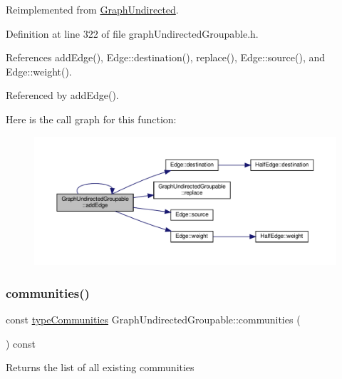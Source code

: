 Reimplemented from \hyperlink{classGraphUndirected_a366c8b7dbf1cbfe408d5399ad64494dc}{Graph\+Undirected}.



Definition at line 322 of file graph\+Undirected\+Groupable.\+h.



References add\+Edge(), Edge\+::destination(), replace(), Edge\+::source(), and Edge\+::weight().



Referenced by add\+Edge().

Here is the call graph for this function\+:\nopagebreak
\begin{figure}[H]
\begin{center}
\leavevmode
\includegraphics[width=350pt]{classGraphUndirectedGroupable_a2efe963916349ac6615721ab85a93ceb_cgraph}
\end{center}
\end{figure}
\mbox{\label{classGraphUndirectedGroupable_a57f8ea4cff0d83b80cca2dc8e8e19ff6}} 
\subsubsection{\texorpdfstring{communities()}{communities()}}
{\footnotesize\ttfamily const \hyperlink{graphUndirectedGroupable_8h_ab79c7252155ca17cb49aa0b1fea30116}{type\+Communities} Graph\+Undirected\+Groupable\+::communities (\begin{DoxyParamCaption}{ }\end{DoxyParamCaption}) const\hspace{0.3cm}{\ttfamily [inline]}}

\begin{DoxyReturn}{Returns}
the list of all existing communities 
\end{DoxyReturn}


